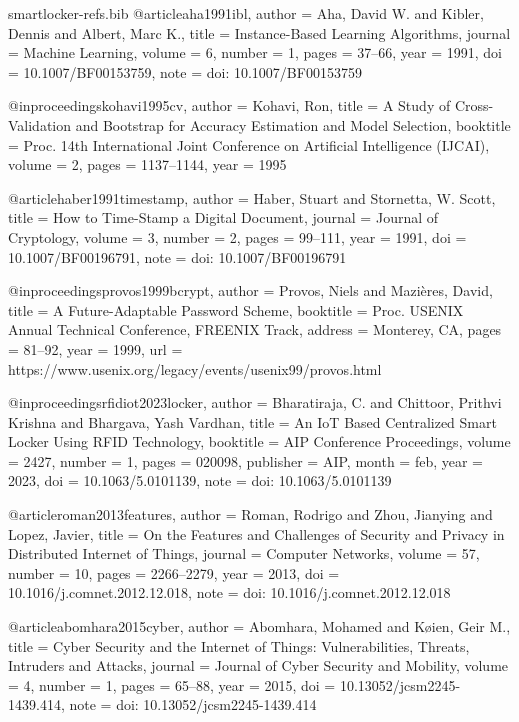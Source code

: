\begin{filecontents*}[overwrite]{smartlocker-refs.bib}
@article{aha1991ibl,
  author  = {Aha, David W. and Kibler, Dennis and Albert, Marc K.},
  title   = {Instance-Based Learning Algorithms},
  journal = {Machine Learning},
  volume  = {6},
  number  = {1},
  pages   = {37--66},
  year    = {1991},
  doi     = {10.1007/BF00153759},
  note    = {doi: 10.1007/BF00153759}
}

@inproceedings{kohavi1995cv,
  author    = {Kohavi, Ron},
  title     = {A Study of Cross-Validation and Bootstrap for Accuracy Estimation and Model Selection},
  booktitle = {Proc. 14th International Joint Conference on Artificial Intelligence (IJCAI)},
  volume    = {2},
  pages     = {1137--1144},
  year      = {1995}
}

@article{haber1991timestamp,
  author  = {Haber, Stuart and Stornetta, W. Scott},
  title   = {How to Time-Stamp a Digital Document},
  journal = {Journal of Cryptology},
  volume  = {3},
  number  = {2},
  pages   = {99--111},
  year    = {1991},
  doi     = {10.1007/BF00196791},
  note    = {doi: 10.1007/BF00196791}
}

@inproceedings{provos1999bcrypt,
  author    = {Provos, Niels and Mazi{\`e}res, David},
  title     = {A Future-Adaptable Password Scheme},
  booktitle = {Proc. USENIX Annual Technical Conference, FREENIX Track},
  address   = {Monterey, CA},
  pages     = {81--92},
  year      = {1999},
  url       = {https://www.usenix.org/legacy/events/usenix99/provos.html}
}

@inproceedings{rfidiot2023locker,
  author    = {Bharatiraja, C. and Chittoor, Prithvi Krishna and Bhargava, Yash Vardhan},
  title     = {An {IoT} Based Centralized Smart Locker Using {RFID} Technology},
  booktitle = {AIP Conference Proceedings},
  volume    = {2427},
  number    = {1},
  pages     = {020098},
  publisher = {AIP},
  month     = feb,
  year      = {2023},
  doi       = {10.1063/5.0101139},
  note      = {doi: 10.1063/5.0101139}
}

@article{roman2013features,
  author  = {Roman, Rodrigo and Zhou, Jianying and Lopez, Javier},
  title   = {On the Features and Challenges of Security and Privacy in Distributed {Internet of Things}},
  journal = {Computer Networks},
  volume  = {57},
  number  = {10},
  pages   = {2266--2279},
  year    = {2013},
  doi     = {10.1016/j.comnet.2012.12.018},
  note    = {doi: 10.1016/j.comnet.2012.12.018}
}

@article{abomhara2015cyber,
  author  = {Abomhara, Mohamed and K{\o}ien, Geir M.},
  title   = {Cyber Security and the {Internet of Things}: Vulnerabilities, Threats, Intruders and Attacks},
  journal = {Journal of Cyber Security and Mobility},
  volume  = {4},
  number  = {1},
  pages   = {65--88},
  year    = {2015},
  doi     = {10.13052/jcsm2245-1439.414},
  note    = {doi: 10.13052/jcsm2245-1439.414}
}


\end{filecontents*}
